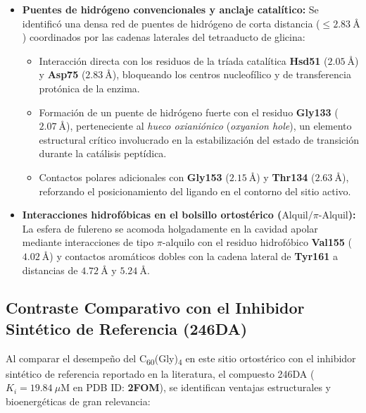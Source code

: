 \begin{itemize}
    \item \textbf{Puentes de hidrógeno convencionales y anclaje catalítico:} Se identificó una densa red de puentes de hidrógeno de corta distancia ($\le 2.83\ \text{\AA}$) coordinados por las cadenas laterales del tetraaducto de glicina:
    \begin{itemize}
        \item Interacción directa con los residuos de la tríada catalítica \textbf{Hsd51} ($2.05\ \text{\AA}$) y \textbf{Asp75} ($2.83\ \text{\AA}$), bloqueando los centros nucleofílico y de transferencia protónica de la enzima.
        \item Formación de un puente de hidrógeno fuerte con el residuo \textbf{Gly133} ($2.07\ \text{\AA}$), perteneciente al \textit{hueco oxianiónico} (\textit{oxyanion hole}), un elemento estructural crítico involucrado en la estabilización del estado de transición durante la catálisis peptídica.
        \item Contactos polares adicionales con \textbf{Gly153} ($2.15\ \text{\AA}$) y \textbf{Thr134} ($2.63\ \text{\AA}$), reforzando el posicionamiento del ligando en el contorno del sitio activo.
    \end{itemize}
    
    \item \textbf{Interacciones hidrofóbicas en el bolsillo ortostérico ($\text{Alquil} / \pi\text{-Alquil}$):} La esfera de fulereno se acomoda holgadamente en la cavidad apolar mediante interacciones de tipo $\pi$-alquilo con el residuo hidrofóbico \textbf{Val155} ($4.02\ \text{\AA}$) y contactos aromáticos dobles con la cadena lateral de \textbf{Tyr161} a distancias de $4.72\ \text{\AA}$ y $5.24\ \text{\AA}$.
\end{itemize}

\subsection{Contraste Comparativo con el Inhibidor Sintético de Referencia (246DA)}

Al comparar el desempeño del C\textsubscript{60}(Gly)\textsubscript{4} en este sitio ortostérico con el inhibidor sintético de referencia reportado en la literatura, el compuesto 246DA ($K_i = 19.84\ \mu\text{M}$ en PDB ID: \textbf{2FOM}), se identifican ventajas estructurales y bioenergéticas de gran relevancia:

